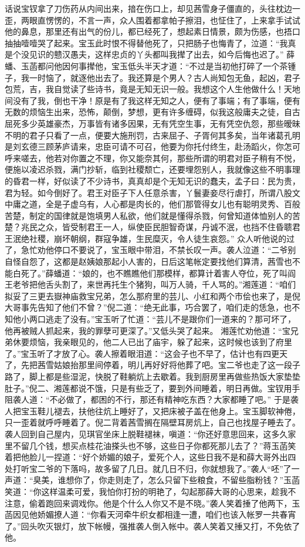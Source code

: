 \documentclass[12pt,oneside]{book}
\begin{document}
话说宝钗拿了刀伤药从内间出来，揞在伤口上，却见茜雪身子僵直的，头往枕边一歪，两眼直愣愣的，不言一声，众人围着都拿帕子擦泪，也怔住了，上来拿手试试他的鼻息，那里还有出气的份儿，都已经死了，想起素日情景，颇为伤感，也捂口抽抽噎噎哭了起来。宝玉此时恨不得替他死了，只把肠子也悔青了，泣道：“我真是个没见识的戆汉愚夫，这样忠贞的丫头都叫我撵了出去，如今后悔也迟了。”
薛蟠、玉菡都问他因何事撵他，宝玉低头半天才道：“不过是当初他打碎了一个茶锺子，我一时恼了，就逐他出去了。我还算是个男人？古人尚知包无鱼，起凶，君子包荒，吉，我自觉读了些诗书，竟是无知无识一般。我想这个人生他做什么！天地间没有了我，倒也干净！原是有了我这样无知之人，便有了事端；有了事端，便有无数的烦恼生出来，恐怖，颠倒，梦想，更有许多缠碍，似我这般庸夫之徒，自古屈死多少英雄豪杰，万事皆有诸多因果，无有凭空生事，无有凭空仇怨，那些暧昧不明的君子只看了一点，便要大施刑罚，古来屈子、子胥何其多矣，当年诸葛孔明是刘玄德三顾茅庐请来，忠臣可请不可召，他要为你托付终生，赴汤蹈火，你怎可呼来嗟去，他若对你置之不理，你又能奈其何，那些所谓的明君对臣子稍有不悦，便施以凌迟杀戮，满门抄斩，临到社稷颓亡，还要埋怨别人，我就像这些不明事理的昏君一样，好似读了不少诗书，真真却是个无知无识的蠢夫，孟子曰：民为贵，君为轻。如今倒好了。君王对臣子下人任意杀害，丫鬟妻妾尽行虐打，所谓八股文中庸之道，全是子虚乌有，人心都是肉长的，他们那管得女儿也有聪明灵秀、百般苦楚，制定的国律就是饱填男人私欲，他们就是懂得杀戮，何曾知道体恤别人的苦楚？兆民之众，皆受制君王一人，纵使臣民胆智奇谋，丹诚不泯，也挡不住昏聩君王泯绝社稷，崩坏朝纲，群寇争雄，生民糜灭，令人徒生哀怨。”
众人听他说的过了，急忙劝他停口不要说了，宝玉眼中带泪，不禁长叹一声。袭人泣道：“二爷别自怪自怨了，这都是赵姨娘那起小人害的，日后这笔帐定要找他们算清，茜雪也不能白死了。”薛蟠道：“娘的，也不瞧瞧他们那模样，都算计着害人夺位，死了叫阎王老爷把他舌头割了，来世再托生个猪狗，叫万人骑，千人骂的。”湘莲道：“咱们拟妥了三更去嶽神庙救宝兄弟，怎么那府里的芸儿、小红和两个市侩也来了，是倪大哥事先告知了他们不曾？”倪二道：“绝无此事，巧合罢了，咱们走的恁急，也不知他小两口逃走了没有。”宝玉听了忙道：“芸儿不是跟你们一道来的？那可坏了，他再被贼人抓起来，我的罪孽可更深了。”又低头哭了起来。
湘莲忙劝他道：“宝兄弟休要烦恼，我亲眼见的，他二人已出了庙宇，躲了起来，这时候也该到了府里了。”宝玉听了才放了心。袭人擦着眼泪道：“这会子也不早了，估计也有四更天了，先把茜雪姑娘抬那里间停着，明儿再好好将他葬了吧。宝二爷也走了这一段子路了，脚上都是些湿泥，快脱了鞋躺炕上去歇着。我到厨房里再做些热饭大家垫垫肚子。”倪二、湘莲都说不饿，只是有些乏了，要到外间睡着，明日再做。宝钗用手阻袭人道：“不必做了，都困的不行，那还有精神吃东西？大家都睡了吧。”
于是袭人把宝玉鞋儿褪去，扶他往炕上睡好了，又把床被子盖在他身上。宝玉脚软神倦，只一歪着就呼呼睡着了。倪二背着茜雪搁在隔壁耳房炕上，自己也找屋子睡去了。袭人回到自己屋内，见琪官坐床上脱鞋褪袜，嗔道：“你还好意思回来，这多久家里不留几个钱，想买点桂花油搽头也不够，这些日子你都死那儿去了？”蒋玉菡笑着把他脸儿一捏道：“好个娇媚的娘子，爱死个人，这些日我不是和薛大哥外出四处打听宝二爷的下落吗，故多留了几日。就几日不归，你就想我了。”袭人“呸”了一声道：“臭美，谁想你了，你走则走了，怎么只留下些粮食，不留些脂粉钱？”玉菡笑道：“你这样温柔可爱，我怕你打扮的明艳了，勾起那薛大哥的心思来，趁我不注意，偷着跑回来调戏你。他是个什么人你又不是不晓。”袭人笑着捶了他两下，玉菡因见他娇媚撩人道：“你看天河牵牛织女都相逢一遭，咱们也该入帐罗一共春宵了。”回头吹灭银灯，放下帐幔，强推袭人倒入帐中。袭人笑着又捶又打，不免依了他。
\end{document}
